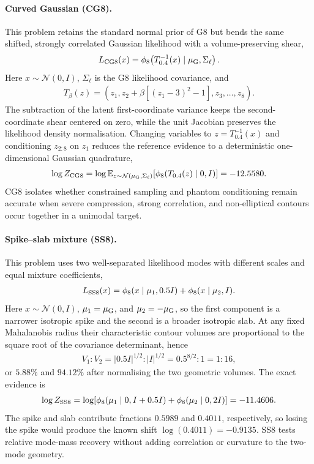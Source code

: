 \documentclass[pdflatex,sn-basic,icol]{sn-jnl}
\newcommand{\E}{\mathbb{E}}
\theoremstyle{plain}
\theoremstyle{definition}
\begin{document}
\paragraph{Curved Gaussian (CG8).}
This problem retains the standard normal prior of G8 but bends the same shifted, strongly correlated Gaussian likelihood with a volume-preserving shear,
\begin{align}
    L_{\rm CG8}(x) = \phi_8\!\left(T_{0.4}^{-1}(x)\mid\mu_{\rm G},\Sigma_\ell\right). \label{eq:cg8_likelihood}
\end{align}
Here $x\sim\mathcal{N}(0,I)$, $\Sigma_\ell$ is the G8 likelihood covariance, and
\begin{align*}
    T_\beta(z)=\left(z_1,z_2+\beta\left[(z_1-3)^2-1\right],z_3,\ldots,z_8\right).
\end{align*}
The subtraction of the latent first-coordinate variance keeps the second-coordinate shear centered on zero, while the unit Jacobian preserves the likelihood density normalisation.
Changing variables to $z=T_{0.4}^{-1}(x)$ and conditioning $z_{2:8}$ on $z_1$ reduces the reference evidence to a deterministic one-dimensional Gaussian quadrature,
\begin{align}
    \log Z_{\rm CG8}
    = \log\E_{z\sim\mathcal{N}(\mu_{\rm G},\Sigma_\ell)}
      \!\left[\phi_8(T_{0.4}(z)\mid0,I)\right]
    = -12.5580. \label{eq:cg8_evidence}
\end{align}
CG8 isolates whether constrained sampling and phantom conditioning remain accurate when severe compression, strong correlation, and non-elliptical contours occur together in a unimodal target.

\paragraph{Spike--slab mixture (SS8).}
This problem uses two well-separated likelihood modes with different scales and equal mixture coefficients,
\begin{align}
    L_{\rm SS8}(x) = \phi_8(x\mid\mu_1,0.5I)+\phi_8(x\mid\mu_2,I). \label{eq:ss8_likelihood}
\end{align}
Here $x\sim\mathcal{N}(0,I)$, $\mu_1=\mu_{\rm G}$, and $\mu_2=-\mu_{\rm G}$, so the first component is a narrower isotropic spike and the second is a broader isotropic slab.
At any fixed Mahalanobis radius their characteristic contour volumes are proportional to the square root of the covariance determinant, hence
\begin{align}
    V_1:V_2
    = |0.5I|^{1/2}:|I|^{1/2}
    = 0.5^{8/2}:1
    = 1:16, \label{eq:ss8_relative_volume}
\end{align}
or $5.88\%$ and $94.12\%$ after normalising the two geometric volumes.
The exact evidence is
\begin{align}
    \log Z_{\rm SS8}
    = \log\!\left[\phi_8(\mu_1\mid0,I+0.5I)
      +\phi_8(\mu_2\mid0,2I)\right]
    = -11.4606. \label{eq:ss8_evidence}
\end{align}
The spike and slab contribute fractions $0.5989$ and $0.4011$, respectively, so losing the spike would produce the known shift $\log(0.4011)=-0.9135$.
SS8 tests relative mode-mass recovery without adding correlation or curvature to the two-mode geometry.
\end{document}
